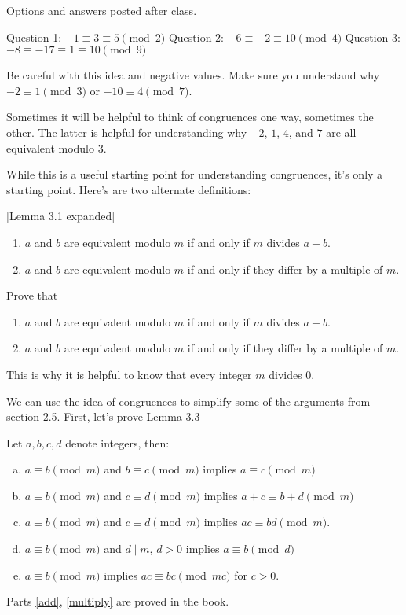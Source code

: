 \documentclass[letterpaper, 11 pt]{article}
\begin{document}
\begin{solution}
 Options and answers posted after class.
 
 Question 1: $-1\equiv 3\equiv 5 \pmod 2$
 Question 2: $-6\equiv-2\equiv 10 \pmod 4$
 Question 3: $-8\equiv -17\equiv 1\equiv 10 \pmod 9$
\end{solution}

Be careful with this idea and negative values. Make sure you understand why $-2\equiv 1\pmod{3}$ or $-10\equiv 4\pmod{7}$.

Sometimes it will be helpful to think of congruences one way, sometimes the other. The latter is helpful for understanding why $-2$, $1$, $4$, and $7$ are all equivalent modulo $3$.

While this is a useful starting point for understanding congruences, it's only a starting point. Here's are two alternate definitions: 
\begin{lem}\label{moddefs}[Lemma 3.1 expanded]
\begin{enumerate}
\item $a$ and $b$ are equivalent modulo $m$ if and only if $m$ divides $a-b$.
\item $a$ and $b$ are equivalent modulo $m$ if and only if they differ by a multiple of $m$.
\end{enumerate}
\end{lem}
\begin{br}
 Prove that 
\begin{enumerate}
	\item $a$ and $b$ are equivalent modulo $m$ if and only if $m$ divides $a-b$.
	\item $a$ and $b$ are equivalent modulo $m$ if and only if they differ by a multiple of $m$.
\end{enumerate}
\end{br}
This is why it is helpful to know that every integer $m$ divides $0$.

We can use the idea of congruences to simplify some of the arguments from section 2.5. First, let's prove Lemma 3.3

\begin{br}
 Let $a,b,c,d$ denote integers, then:
\begin{enumerate}[(a)]
\item $a\equiv b \pmod{m}$ and $b\equiv c \pmod{m}$ implies $a\equiv c \pmod{m}$
\item\label{add} $a\equiv b \pmod{m}$ and $c\equiv d \pmod{m}$ implies $a+c \equiv b+d \pmod{m}$ 
\item\label{multiply} $a\equiv b\pmod{m}$ and $c\equiv d \pmod{m}$ implies $ac\equiv bd \pmod{m}$.
\item $a\equiv b \pmod{m}$ and $d\mid m$, $d>0$ implies $a\equiv b \pmod{d}$
\item $a\equiv b \pmod{m}$ implies $ac\equiv bc \pmod{mc}$ for $c>0$.
\end{enumerate}
Parts \eqref{add}, \eqref{multiply} are proved in the book.
\end{br}
\end{document}
